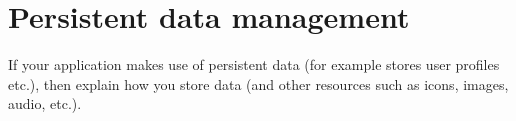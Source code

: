 \section{Persistent data management}

If your application makes use of persistent data (for example stores user
profiles etc.), then explain how you store data (and other resources such as
icons, images, audio, etc.).